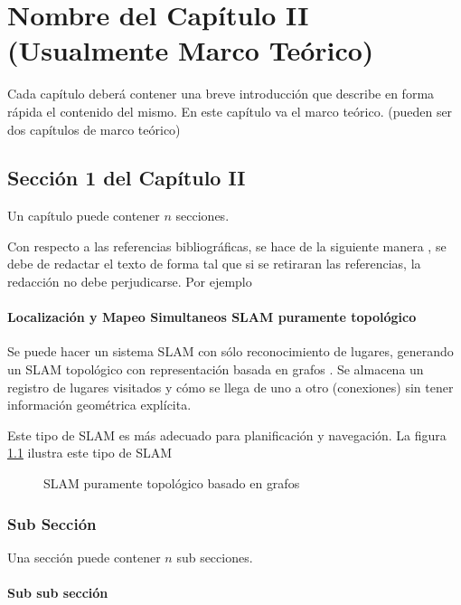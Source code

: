 \chapter{Nombre del Capítulo II (Usualmente Marco Teórico)}\label{chap:background}

Cada capítulo deberá contener una breve introducción que describe en forma rápida el contenido del
mismo. En este capítulo va el marco teórico. (pueden ser dos capítulos de marco teórico)

\section{Sección 1 del Capítulo II}

Un capítulo puede contener $n$ secciones. 

Con respecto a las referencias bibliográficas, se hace de la siguiente manera \cite{Mateos00}, se debe de redactar el texto de forma tal que si se retiraran las referencias, la redacción no debe perjudicarse. Por ejemplo 

\subsubsection{Localización y Mapeo Simultaneos SLAM puramente topológico}
Se puede hacer un sistema SLAM con sólo reconocimiento de lugares, generando un SLAM topológico con representación basada en grafos \cite{Choset_2001}. Se almacena un registro de lugares visitados y cómo se llega de uno a otro (conexiones) sin tener información geométrica explícita.

Este tipo de SLAM es más adecuado para planificación y navegación. La figura \ref{Fig:SLAMTopological} ilustra este tipo de SLAM 
    
\begin{figure}[ht]
\centering
\caption{SLAM puramente topológico basado en grafos}
\label{Fig:SLAMTopological}
\end{figure}


\subsection{Sub Sección}

Una sección puede contener $n$ sub secciones.\cite{Galante01}

\subsubsection{Sub sub sección}

